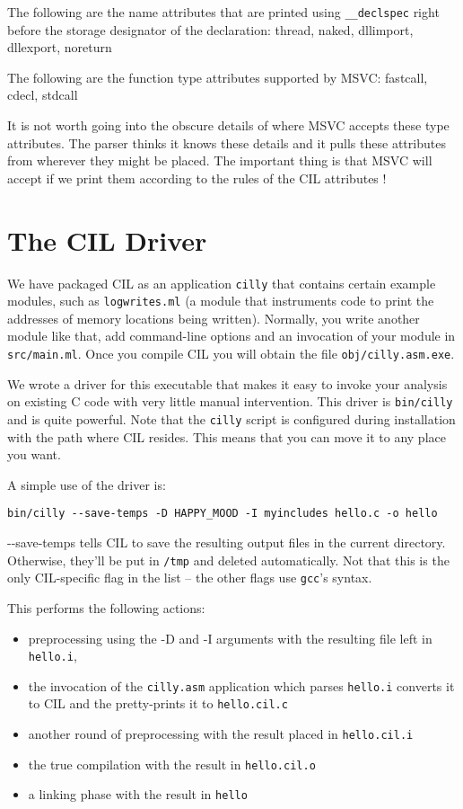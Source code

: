 \documentclass{article}
\def\t#1{{\tt #1}}
\newcommand\codecolor{\ifhevea\blue\else\fi}
\renewcommand\c[1]{{\codecolor #1}} %
\begin{document}
   The following are the name attributes that are printed using
   \t{\_\_declspec} right before the storage designator of the declaration:
   thread, naked, dllimport, dllexport, noreturn


   The following are the function type attributes supported by MSVC: 
   fastcall, cdecl, stdcall

   It is not worth going into the obscure details of where MSVC accepts these
   type attributes. The parser thinks it knows these details and it pulls
   these attributes from wherever they might be placed. The important thing
   is that MSVC will accept if we print them according to the rules of the CIL
   attributes ! 

\section{The CIL Driver}\label{sec-driver}

 We have packaged CIL as an application \t{cilly} that contains certain
example modules, such as \t{logwrites.ml} (a module
that instruments code to print the addresses of memory locations being
written). Normally, you write another module like that, add command-line
options and an invocation of your module in \t{src/main.ml}. Once you compile
CIL you will obtain the file \t{obj/cilly.asm.exe}. 

 We wrote a driver for this executable that makes it easy to invoke your
analysis on existing C code with very little manual intervention. This driver
is \t{bin/cilly} and is quite powerful. Note that the \t{cilly} script
is configured during installation with the path where CIL resides. This means
that you can move it to any place you want. 

 A simple use of the driver is:
\begin{verbatim}
bin/cilly --save-temps -D HAPPY_MOOD -I myincludes hello.c -o hello
\end{verbatim}

\c{-{}-save-temps} tells CIL to save the resulting output files in the
current directory.  Otherwise, they'll be put in \t{/tmp} and deleted
automatically.  Not that this is the only CIL-specific flag in the
list -- the other flags use \t{gcc}'s syntax.

This performs the following actions: 
\begin{itemize}
\item preprocessing using the -D and -I arguments with the resulting 
  file left in \t{hello.i}, 
\item the invocation of the \t{cilly.asm} application which parses \t{hello.i}
  converts it to CIL and the pretty-prints it to \t{hello.cil.c}
\item another round of preprocessing with the result placed in \t{hello.cil.i}
\item the true compilation with the result in \t{hello.cil.o}
\item a linking phase with the result in \t{hello}
\end{itemize}
 
\end{document}
